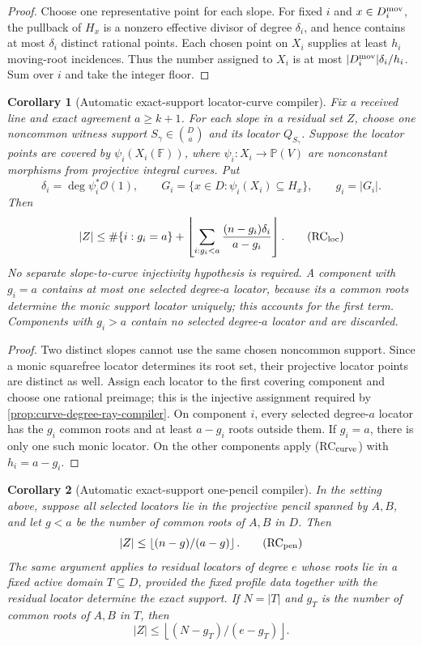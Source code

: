 \documentclass[12pt,a4paper]{amsart}
\numberwithin{equation}{section}
\newtheorem{corollary}[corollary]{Corollary}
\theoremstyle{remark}
\newcommand{\F}{\mathbb F}
\newcommand{\Pj}{\mathbb P}
\newcommand{\abs}[1]{\lvert #1\rvert}
\newcommand{\floor}[1]{\left\lfloor #1\right\rfloor}
\begin{document}
\begin{proof}
Choose one representative point for each slope.  For fixed \(i\) and
\(x\in D_i^{\rm mov}\), the pullback of \(H_x\) is a nonzero effective
divisor of degree \(\delta_i\), and hence contains at most \(\delta_i\)
distinct rational points.  Each chosen point on \(X_i\) supplies at least
\(h_i\) moving-root incidences.  Thus the number assigned to \(X_i\) is
at most \(\abs{D_i^{\rm mov}}\delta_i/h_i\).  Sum over \(i\) and take
the integer floor.
\end{proof}

\begin{corollary}[Automatic exact-support locator-curve compiler]
\label{cor:automatic-locator-curve-ray}
Fix a received line and exact agreement \(a\ge k+1\).  For each slope in
a residual set \(Z\), choose one noncommon witness support
\(S_\gamma\in\binom Da\) and its locator \(Q_{S_\gamma}\).  Suppose the
locator points are covered by
\(\psi_i(X_i(\F))\), where
\(\psi_i:X_i\to\Pj(V)\) are nonconstant morphisms from projective
integral curves.  Put
\[
 \delta_i=\deg\psi_i^*\mathcal O(1),\qquad
 G_i=\{x\in D:\psi_i(X_i)\subseteq H_x\},
 \qquad g_i=\abs{G_i}.
\]
Then
\[
 \abs Z\le
 \#\{i:g_i=a\}+
 \floor{\sum_{i:g_i<a}\frac{(n-g_i)\delta_i}{a-g_i}}. \tag{RC$_{\rm loc}$}
\]
No separate slope-to-curve injectivity hypothesis is required.  A
component with \(g_i=a\) contains at most one selected degree-\(a\)
locator, because its \(a\) common roots determine the monic support
locator uniquely; this accounts for the first term.  Components with
\(g_i>a\) contain no selected degree-\(a\) locator and are discarded.
\end{corollary}

\begin{proof}
Two distinct slopes cannot use the same chosen noncommon support.  Since a
monic squarefree locator determines its root set, their projective locator
points are distinct as well.  Assign each locator to the first covering
component and choose one rational preimage; this is the injective
assignment required by \cref{prop:curve-degree-ray-compiler}.  On
component \(i\), every selected degree-\(a\) locator has the \(g_i\)
common roots and at least \(a-g_i\) roots outside them.  If \(g_i=a\),
there is only one such monic locator.  On the other components apply
\textup{(RC$_{\rm curve}$)} with \(h_i=a-g_i\).
\end{proof}

\begin{corollary}[Automatic exact-support one-pencil compiler]
\label{cor:automatic-one-pencil-ray}
In the setting above, suppose all selected locators lie in the projective
pencil spanned by \(A,B\), and let \(g<a\) be the number of common roots
of \(A,B\) in \(D\).  Then
\[
                         \abs Z\le\floor{(n-g)/(a-g)}. \tag{RC$_{\rm pen}$}
\]
The same argument applies to residual locators of degree \(e\) whose roots
lie in a fixed active domain \(T\subseteq D\), provided the fixed profile
data together with the residual locator determine the exact support.  If
\(N=\abs T\) and \(g_T\) is the number of common roots of \(A,B\) in
\(T\), then
\[
                         \abs Z\le\floor{(N-g_T)/(e-g_T)}.
\]
\end{corollary}
\end{document}
